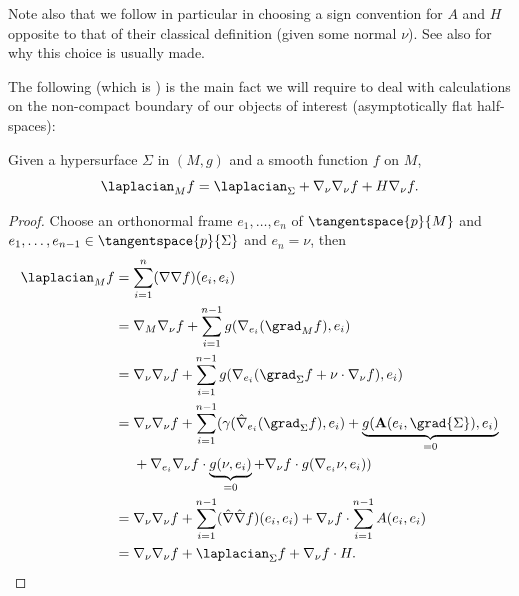 \documentclass[titlepage,numbers=noenddot,headinclude,oneside,%
footinclude=true,cleardoublepage=empty,%
BCOR=5mm,paper=a4,fontsize=11pt,%
english,%
]{scrartcl}
\begin{document}
{\begin{remark}
    Note also that we follow in particular \cite{almarazPositiveMassTheorem2016} in choosing a sign convention for \( A \) and \( H \) opposite to that of their classical definition (given some normal \( \nu \)). See also \cite[Remark 2.1]{leeGeometricRelativity2019} for why this choice is usually made.
\end{remark}

The following (which is \cite[Exercise 2.3 in][]{leeGeometricRelativity2019}) is the main fact we will require to deal with calculations on the non-compact boundary of our objects of interest (asymptotically flat half-spaces):
\begin{fact}\label{fact:laplacian_and_hypersurface_laplacian}
    Given a hypersurface \( \Sigma \) in \( (M,g) \) and a smooth function \( f \) on \( M \),
    \begin{equation*}
        \laplacian_M f=\laplacian_\Sigma +\Mconnection_\nu\Mconnection_\nu f+H \Mconnection_\nu f.
    \end{equation*}
\end{fact}
\begin{proof}
    Choose an orthonormal frame \( e_1,\dotsc,e_n \) of \( \tangentspace{p}{M} \) and \( e_1,\dotsc,e_{n-1}\in \tangentspace{p}{\Sigma} \) and \( e_n=\nu \), then
    \begin{align*}
        \laplacian_M f&=\sum_{i=1}^{n}(\Mconnection\Mconnection f)(e_i,e_i)\\
        &=\Mconnection_M \Mconnection_\nu f+\sum_{i=1}^{n-1}g(\Mconnection_{e_i} (\grad_M f),e_i)\\
        &=\Mconnection_\nu \Mconnection_\nu f+\sum_{i=1}^{n-1}g(\Mconnection_{e_i}(\grad_{\Sigma}f+\nu\cdot \Mconnection_\nu f),e_i)\\
        &=\begin{aligned}[t]
            &\Mconnection_\nu \Mconnection_\nu f+\sum_{i=1}^{n-1}(\gamma(\Sigmaconnection_{e_i}(\grad_{\Sigma} f),e_i)+\underbrace{g(\mathbf{A}(e_i,\grad{\Sigma}),e_i)}_{=0}\\
            &+\Mconnection_{
        e_i}\Mconnection_{\nu}f\cdot \underbrace{g(\nu,e_i)}_{=0}+\Mconnection_{\nu}f\cdot g(\Mconnection_{e_i}\nu,e_i))
        \end{aligned}\\
        &=\Mconnection_\nu \Mconnection_\nu f+\sum_{i=1}^{n-1}(\Sigmaconnection\Sigmaconnection f)(e_i,e_i)+\Mconnection_\nu f\cdot \sum_{i=1}^{n-1}A(e_i,e_i)\\
        &=\Mconnection_\nu \Mconnection_\nu f+\laplacian_{\Sigma}f+\Mconnection_{\nu}f\cdot H.
    \end{align*}
\end{proof}
}
\end{document}
